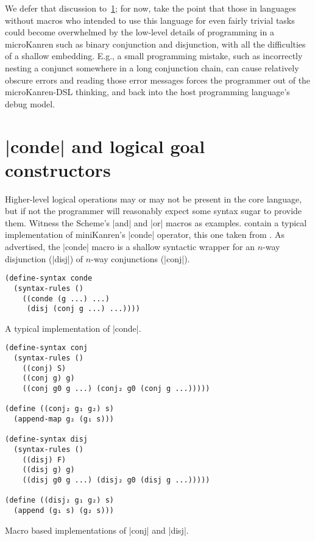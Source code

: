 \documentclass[sigplan,screen,draft,anonymous,review,natbib=false]{acmart}
\begin{document}
We defer that discussion to~\cref{sec:conde}; for now, take the point
that those in languages without macros who intended to use this
language for even fairly trivial tasks could become overwhelmed by the
low-level details of programming in a microKanren such as binary
conjunction and disjunction, with all the difficulties of a shallow
embedding. E.g., a small programming mistake, such as incorrectly
nesting a conjunct somewhere in a long conjunction chain, can cause
relatively obscure errors and reading those error messages forces the
programmer out of the microKanren-DSL thinking, and back into the host
programming language's debug model.

\section{\rackinline|conde| and logical goal constructors}\label{sec:conde}


Higher-level logical operations may or may not be present in the core
language, but if not the programmer will reasonably expect some syntax
sugar to provide them. Witness the Scheme's \rackinline|and| and
\rackinline|or| macros as examples.
contain a typical implementation of miniKanren's \rackinline|conde|
operator, this one taken from . As
advertised, the \rackinline|conde| macro is a shallow syntactic
wrapper for an $n$-way disjunction (\rackinline|disj|) of $n$-way
conjunctions (\rackinline|conj|).

\begin{listing}
  \begin{verbatim}
(define-syntax conde
  (syntax-rules ()
    ((conde (g ...) ...)
     (disj (conj g ...) ...))))
  \end{verbatim}
\caption{A typical implementation of \rackinline|conde|.}
  \label{mnt:conde-implementation}
\end{listing}


\begin{listing}
  \begin{verbatim}
(define-syntax conj
  (syntax-rules ()
    ((conj) S)
    ((conj g) g)
    ((conj g0 g ...) (conj₂ g0 (conj g ...)))))

(define ((conj₂ g₁ g₂) s)
  (append-map g₂ (g₁ s)))

(define-syntax disj
  (syntax-rules ()
    ((disj) F)
    ((disj g) g)
    ((disj g0 g ...) (disj₂ g0 (disj g ...)))))

(define ((disj₂ g₁ g₂) s)
  (append (g₁ s) (g₂ s)))
  \end{verbatim}
  \caption{Macro based implementations of \rackinline|conj| and \rackinline|disj|.}
  \label{mnt:conj-and-disj-implementation}
\end{listing}
\end{document}

